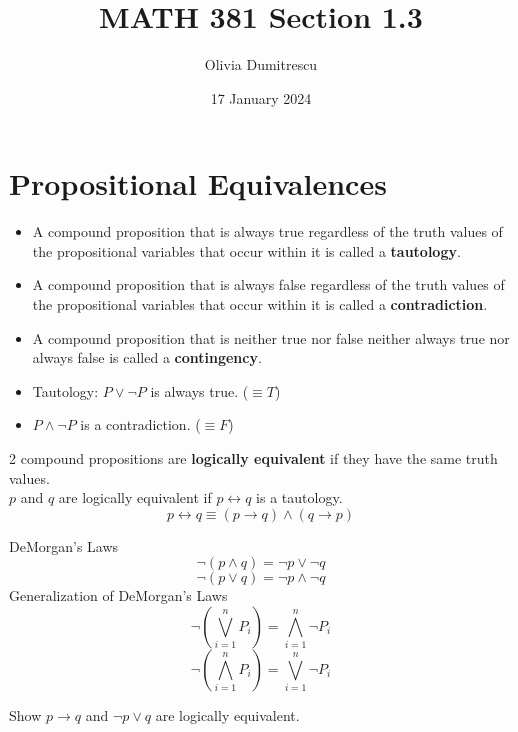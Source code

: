 \documentclass[a4paper, 12pt]{article}
\title{MATH 381 Section 1.3}
\author{Olivia Dumitrescu}
\date{17 January 2024}
\newenvironment{definition}[1][Definition]{\begin{trivlist}
\item[\hskip \labelsep {\bfseries #1}]}{\end{trivlist}}
\newenvironment{example}[1][Example]{\begin{trivlist}
\item[\hskip \labelsep {\bfseries #1}]}{\end{trivlist}}
\newenvironment{remark}[1][Remark]{\begin{trivlist}
\item[\hskip \labelsep {\bfseries #1}]}{\end{trivlist}}
\newcommand{\keyword}[1]{\textbf{#1}}
\begin{document}
    \maketitle
    \section*{Propositional Equivalences}
    \begin{definition}
        \hfill
        \begin{itemize}
            \item A compound proposition that is always true regardless of the
            truth values of the propositional variables that occur within
            it is called a \keyword{tautology}.
            \item A compound proposition that is always false regardless of the
            truth values of the propositional variables that occur within
            it is called a \keyword{contradiction}.
            \item A compound proposition that is neither true nor false neither
            always true nor always false is called a \keyword{contingency}.
        \end{itemize}
    \end{definition}
    \begin{example}
        \hfill
        \begin{itemize}
            \item Tautology: $P \vee \neg P$ is always true. ($\equiv T$)
            \item $P \wedge \neg P$ is a contradiction. ($\equiv F$)
        \end{itemize}
    \end{example}
    \begin{remark}
        2 compound propositions are \keyword{logically equivalent} if they
        have the same truth values.\\
        $p$ and $q$ are logically equivalent if $p \leftrightarrow q$ is a
        tautology.
        \[ p \leftrightarrow q \equiv (p \rightarrow q) \wedge
        (q \rightarrow p) \]
    \end{remark}
    DeMorgan's Laws
    \[ \neg (p \wedge q) = \neg p \vee \neg q\]
    \[ \neg (p \vee q) = \neg p \wedge \neg q\]
    Generalization of DeMorgan's Laws
    \[ \neg (\bigvee_{i=1}^{n} P_i) = \bigwedge_{i=1}^{n} \neg P_i \]
    \[ \neg (\bigwedge_{i=1}^{n} P_i) = \bigvee_{i=1}^{n} \neg P_i \]
    \begin{example}
        Show $p \rightarrow q$ and $\neg p \vee q$ are logically equivalent.
    \end{example}
\end{document}
